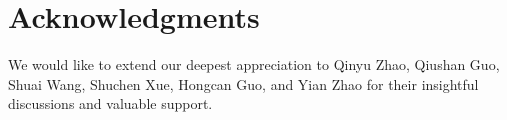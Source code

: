 \documentclass[]{bytedance_seed}
\begin{document}
\section*{Acknowledgments}
We would like to extend our deepest appreciation to Qinyu Zhao, Qiushan Guo, Shuai Wang, Shuchen Xue, Hongcan Guo, and Yian Zhao for their insightful discussions and valuable support.



\beginappendix


\clearpage



\end{document}
